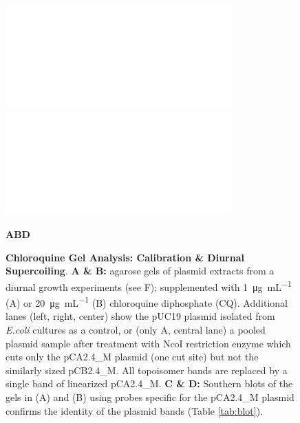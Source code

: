 \documentclass[10pt,a4]{article}
\newcommand{\ugml}{\micro\gram\per\milli\liter}
\begin{document}
\begin{figure}[ht!]
  \begin{minipage}{.49\textwidth}
    \includegraphics[width=\textwidth]{figures/diurnal/20130620_pCA_CQ1.png}
  \end{minipage}
  \begin{minipage}{.49\textwidth}
    \includegraphics[width=\textwidth]{figures/diurnal/20130821_pCA_CQ20.png}
  \end{minipage}
  
  \vspace{-.5cm}
  \textbf{A}\hspace{.32\textwidth}\textbf{B}\hspace{.32\textwidth}\textbf{D}

  \caption{\textbf{Chloroquine Gel Analysis: Calibration \& Diurnal
      Supercoiling}. \small{\textbf{A \& B:} agarose gels of plasmid
      extracts from a diurnal growth experiments (see F); supplemented
      with \SI{1}{\ugml} (A) or \SI{20}{\ugml} (B) chloroquine
      diphosphate (CQ).  Additional lanes (left, right, center) show
      the pUC19 plasmid isolated from \textit{E.coli} cultures as a
      control, or (only A, central lane) a pooled plasmid sample after
      treatment with NcoI restriction enzyme which cuts only the
      pCA2.4\_M plasmid (one cut site) but not the similarly sized
      pCB2.4\_M. All topoisomer bands are replaced by a single band of
      linearized pCA2.4\_M. \textbf{C \& D:} Southern blots of the
      gels in (A) and (B) using probes specific for the pCA2.4\_M
      plasmid confirms the identity of the plasmid bands (Table
      \ref{tab:blot}).}}
    \label{fig:diurnalcq} 
\end{figure}
\end{document}

